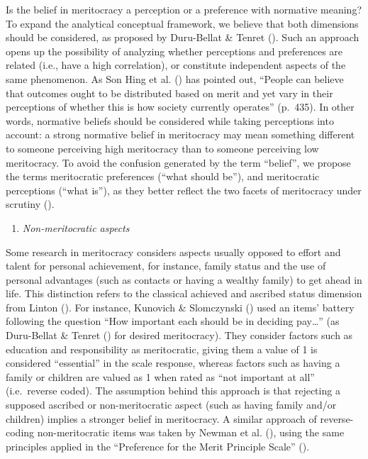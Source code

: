 \documentclass[
  10pt,
  a4paper,
]{article}
\providecommand{\tightlist}{%
  \setlength{\itemsep}{0pt}\setlength{\parskip}{0pt}}
\begin{document}
Is the belief in meritocracy a perception or a preference with normative meaning? To expand the analytical conceptual framework, we believe that both dimensions should be considered, as proposed by Duru-Bellat \& Tenret (). Such an approach opens up the possibility of analyzing whether perceptions and preferences are related (i.e., have a high correlation), or constitute independent aspects of the same phenomenon. As Son Hing et al. () has pointed out, ``People can believe that outcomes ought to be distributed based on merit and yet vary in their perceptions of whether this is how society currently operates'' (p.~435). In other words, normative beliefs should be considered while taking perceptions into account: a strong normative belief in meritocracy may mean something different to someone perceiving high meritocracy than to someone perceiving low meritocracy. To avoid the confusion generated by the term ``belief'', we propose the terms meritocratic preferences (``what should be''), and meritocratic perceptions (``what is''), as they better reflect the two facets of meritocracy under scrutiny ().

\begin{enumerate}
\def\labelenumi{\alph{enumi}.}
\setcounter{enumi}{2}
\tightlist
\item
  \emph{Non-meritocratic aspects}
\end{enumerate}

Some research in meritocracy considers aspects usually opposed to effort and talent for personal achievement, for instance, family status and the use of personal advantages (such as contacts or having a wealthy family) to get ahead in life. This distinction refers to the classical achieved and ascribed status dimension from Linton (). For instance, Kunovich \& Slomczynski () used an items' battery following the question ``How important each should be in deciding pay\ldots{}'' (as Duru-Bellat \& Tenret () for desired meritocracy). They consider factors such as education and responsibility as meritocratic, giving them a value of 1 is considered ``essential'' in the scale response, whereas factors such as having a family or children are valued as 1 when rated as ``not important at all'' (i.e.~reverse coded). The assumption behind this approach is that rejecting a supposed ascribed or non-meritocratic aspect (such as having family and/or children) implies a stronger belief in meritocracy. A similar approach of reverse-coding non-meritocratic items was taken by Newman et al. (), using the same principles applied in the ``Preference for the Merit Principle Scale'' ().
\end{document}
